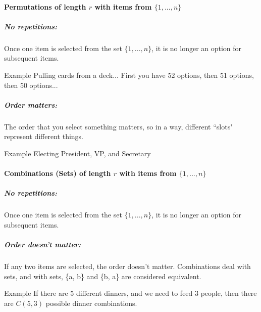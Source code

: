 \documentclass[a4paper,12pt]{book}
\begin{document}
        \newpage        
        
        \begin{introNOHEAD}{}
            \paragraph{Permutations of length $r$ with items from $\{1, ..., n\}$}
                \subparagraph{No repetitions:}
                    Once one item is selected from the set $\{1, ..., n\}$,
                    it is no longer an option for subsequent items.
                    
                    \begin{hint}{Example}
                        Pulling cards from a deck... First you have 52 options,
                        then 51 options, then 50 options...
                    \end{hint}
                    
                \subparagraph{Order matters:}
                    The order that you select something matters, so
                    in a way, different ``slots" represent different things.
                    
                    \begin{hint}{Example}
                        Electing President, VP, and Secretary
                    \end{hint}

            \hrulefill

            \paragraph{Combinations (Sets) of length $r$ with items from $\{1, ..., n\}$}
                \subparagraph{No repetitions:}
                    Once one item is selected from the set $\{1, ..., n\}$,
                    it is no longer an option for subsequent items.

                \subparagraph{Order doesn't matter:}
                    If any two items are selected, the order doesn't matter.
                    Combinations deal with sets, and with sets, \{a, b\} and
                    \{b, a\} are considered equivalent.
                
                \begin{hint}{Example}
                    If there are 5 different dinners, and we
                    need to feed 3 people, then there are $C(5,3)$ possible
                    dinner combinations.
                \end{hint}

        \end{introNOHEAD}
\end{document}
